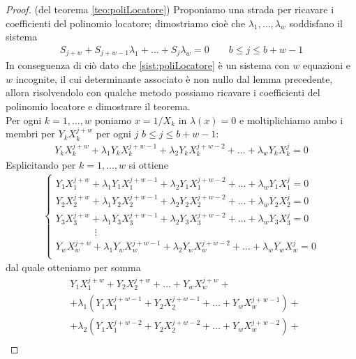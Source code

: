 \begin{proof}(del teorema \ref{teo:poliLocatore})
   Proponiamo una strada per ricavare i coefficienti del polinomio locatore;
   dimostriamo cioè che $\lambda_{1}, \dots ,\lambda_{w}$ soddisfano il sistema 
   \begin{align}\label{sist:poliLocatore}
      S_{j+w} + S_{j+w-1}\lambda_{1} + \dots + S_{j}\lambda_{w} = 0 \qquad b \leq j \leq b+w-1
   \end{align}
   In conseguenza di ciò dato che \ref{sist:poliLocatore} è un sistema con $w$ equazioni e $w$ incognite, il cui determinante associato è non nullo dal lemma precedente, allora risolvendolo con qualche metodo possiamo ricavare i coefficienti del polinomio locatore e dimostrare il teorema.\\
   Per ogni $k=1, \dots, w$ poniamo $x=1/X_{k}$ in $\lambda(x) = 0$ e moltiplichiamo ambo i membri per $Y_{k}X_{k}^{j+w}$ per ogni $j$ $b \leq j \leq b+w-1$:
   \begin{align*}
      Y_{k}X_{k}^{j+w} + \lambda_{1}Y_{k}X_{k}^{j+w-1} + \lambda_{2}Y_{k}X_{k}^{j+w-2} + \dots + \lambda_{w}Y_{k}X_{k}^{j} = 0
   \end{align*}
   Esplicitando per $k=1, \dots, w$ si ottiene
   \begin{align*}
      \left\{
 	\begin{array} {l}
 	Y_{1}X_{1}^{j+w} + \lambda_{1}Y_{1}X_{1}^{j+w-1} + \lambda_{2}Y_{1}X_{1}^{j+w-2} + \dots + \lambda_{w}Y_{1}X_{1}^{j} = 0 \\
 	Y_{2}X_{2}^{j+w} + \lambda_{1}Y_{2}X_{2}^{j+w-1} + \lambda_{2}Y_{2}X_{2}^{j+w-2} + \dots + \lambda_{w}Y_{2}X_{2}^{j} = 0 \\
 	Y_{3}X_{3}^{j+w} + \lambda_{1}Y_{3}X_{3}^{j+w-1} + \lambda_{2}Y_{3}X_{3}^{j+w-2} + \dots + \lambda_{w}Y_{3}X_{3}^{j} = 0 \\
 	\qquad \qquad \vdots \\
 	Y_{w}X_{w}^{j+w} + \lambda_{1}Y_{w}X_{w}^{j+w-1} + \lambda_{2}Y_{w}X_{w}^{j+w-2} + \dots + \lambda_{w}Y_{w}X_{w}^{j} = 0 \\
 	\end{array}
 	\right.
   \end{align*}
   dal quale otteniamo per somma
   \begin{align*}
      &Y_{1}X_{1}^{j+w} + Y_{2}X_{2}^{j+w} + \dots + Y_{w}X_{w}^{j+w} + \\
      &+ \lambda_{1}( Y_{1}X_{1}^{j+w-1} + Y_{2}X_{2}^{j+w-1} + \dots + Y_{w}X_{w}^{j+w-1}) + \\
      &+ \lambda_{2}( Y_{1}X_{1}^{j+w-2} + Y_{2}X_{2}^{j+w-2} + \dots + Y_{w}X_{w}^{j+w-2}) + \\

\end{align*}
\end{proof}
